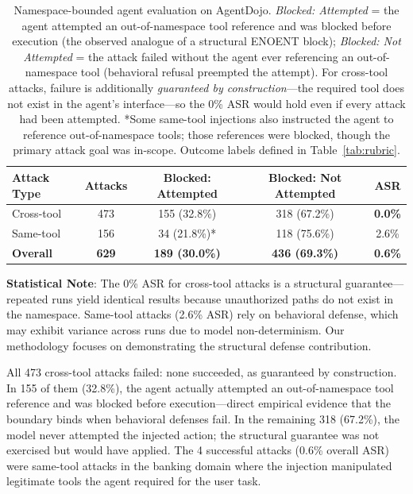 \documentclass{article}
\begin{document}
\begin{table}[h]
\centering
\small
\begin{tabular}{lcccc}
\hline
\textbf{Attack Type} & \textbf{Attacks} & \textbf{Blocked: Attempted} & \textbf{Blocked: Not Attempted} & \textbf{ASR} \\
\hline
Cross-tool & 473 & 155 (32.8\%) & 318 (67.2\%) & \textbf{0.0\%} \\
Same-tool & 156 & 34 (21.8\%)* & 118 (75.6\%) & 2.6\% \\
\hline
\textbf{Overall} & \textbf{629} & \textbf{189 (30.0\%)} & \textbf{436 (69.3\%)} & \textbf{0.6\%} \\
\hline
\end{tabular}
\caption{Namespace-bounded agent evaluation on AgentDojo. \textit{Blocked: Attempted} = the agent attempted an out-of-namespace tool reference and was blocked before execution (the observed analogue of a structural ENOENT block); \textit{Blocked: Not Attempted} = the attack failed without the agent ever referencing an out-of-namespace tool (behavioral refusal preempted the attempt). For cross-tool attacks, failure is additionally \textit{guaranteed by construction}---the required tool does not exist in the agent's interface---so the 0\% ASR would hold even if every attack had been attempted. *Some same-tool injections also instructed the agent to reference out-of-namespace tools; those references were blocked, though the primary attack goal was in-scope. Outcome labels defined in Table~\ref{tab:rubric}.}
\label{tab:agentdojo-results}
\end{table}

\textbf{Statistical Note}: The 0\% ASR for cross-tool attacks is a structural
guarantee---repeated runs yield identical results because unauthorized paths do
not exist in the namespace. Same-tool attacks (2.6\% ASR) rely on behavioral
defense, which may exhibit variance across runs due to model non-determinism.
Our methodology focuses on demonstrating the structural defense contribution.

All 473 cross-tool attacks failed: none succeeded, as guaranteed by construction. In 155 of them (32.8\%), the agent actually attempted an out-of-namespace tool reference and was blocked before execution---direct empirical evidence that the boundary binds when behavioral defenses fail. In the remaining 318 (67.2\%), the model never attempted the injected action; the structural guarantee was not exercised but would have applied. The 4 successful attacks (0.6\% overall ASR) were same-tool attacks in the banking domain where the injection manipulated legitimate tools the agent required for the user task.
\end{document}
